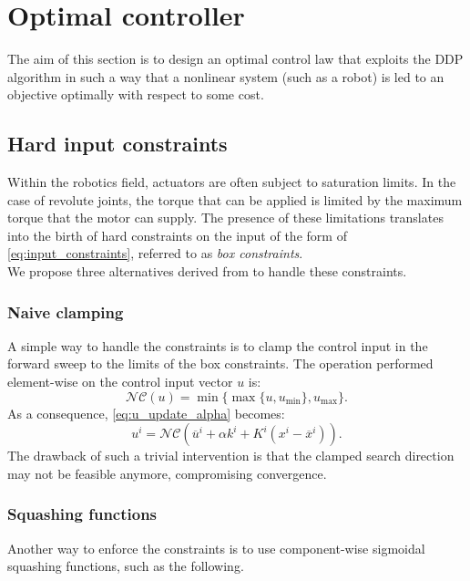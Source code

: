 \section{Optimal controller}
The aim of this section is to design an optimal control law that exploits the DDP algorithm in such a way that a nonlinear system (such as a robot) is led to an objective optimally with respect to some cost. 

\subsection{Hard input constraints}
Within the robotics field, actuators are often subject to saturation limits. In the case of revolute joints, the torque that can be applied is limited by the maximum torque that the motor can supply. The presence of these limitations translates into the birth of hard constraints on the input of the form of \ref{eq:input_constraints}, referred to as \textit{box constraints}. \\
We propose three alternatives derived from \cite{tassa14} to handle these constraints.

\subsubsection{Naive clamping}
A simple way to handle the constraints is to clamp the control input in the forward sweep to the limits of the box constraints. The operation performed element-wise on the control input vector $u$ is:
\begin{equation*}
    \mathcal{N}\mathcal{C}(u) =\min\{\max\{u, u_{\text{min}}\}, u_{\text{max}}\}.
\end{equation*}
As a consequence, \ref{eq:u_update_alpha} becomes:
\begin{equation}
    u^i = \mathcal{N}\mathcal{C}(\overline{u}^i + \alpha k^i + K^i (x^i - \overline{x}^i)). \label{eq:u_update_alpha_clamp}
\end{equation} 
The drawback of such a trivial intervention is that the clamped search direction may not be feasible anymore, compromising convergence.

\subsubsection{Squashing functions}
Another way to enforce the constraints is to use component-wise sigmoidal squashing functions, such as the following.

